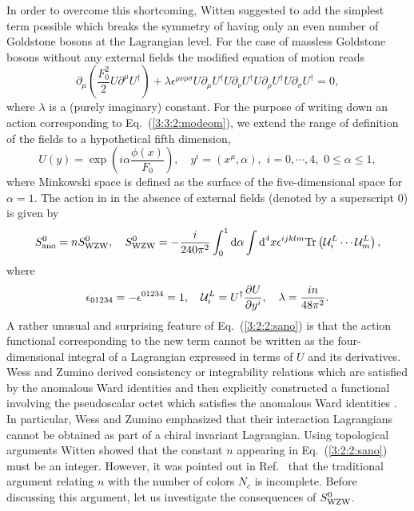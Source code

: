 \documentclass[twoside,12pt]{article}
\begin{document}
   In order to overcome this shortcoming, Witten suggested to add the simplest term
possible which breaks the symmetry of having only an even number of Goldstone
bosons at the Lagrangian level.
   For the case of massless Goldstone bosons without any
external fields the modified equation of motion reads
\begin{equation}
\label{3:3:2:modeom}
\partial_\mu\left(\frac{F_0^2}{2}U\partial^\mu U^\dagger\right)
+\lambda \epsilon^{\mu\nu\rho\sigma} U\partial_\mu U^\dagger
U\partial_\nu U^\dagger U\partial_\rho U^\dagger U\partial_\sigma
U^\dagger=0,
\end{equation}
where $\lambda$ is a (purely imaginary) constant.
   For the purpose of writing down an action corresponding to Eq.~(\ref{3:3:2:modeom}),
we extend the range of definition of the fields to a
hypothetical fifth dimension,
\begin{equation}
\label{3:2:ualpha}
U(y)=\exp\left(i\alpha\frac{\phi(x)}{F_0}\right),
\quad y^i=(x^\mu,\alpha),\,\,i=0,\cdots, 4,\,\, 0\leq\alpha\leq 1,
\end{equation}
   where Minkowski space is defined as the surface of the five-dimensional
space for $\alpha =1$.
   The action in in the absence of external fields (denoted by a superscript 0)
is given by \cite{Witten:1983tw}
\begin{equation}
\label{3:2:2:sano}
S_{\rm ano}^0=n S_{\rm WZW}^0,\quad
S_{\rm WZW}^0=-\frac{i}{240\pi^2}\int_0^1 \mbox{d} \alpha \int \mbox{d}^4 x
\epsilon^{ijklm} \mbox{Tr}\left( {\cal U}^L_i\cdots {\cal U}^L_m
\right),
\end{equation}
where
\begin{displaymath}
\epsilon_{01234}=-\epsilon^{01234}=1,\quad {\cal U}^L_i=U^\dagger
\frac{\partial U}{\partial y^i},\quad \lambda=\frac{in}{48\pi^2}.
\end{displaymath}
   A rather unusual and surprising feature of Eq.~(\ref{3:2:2:sano})
is that the action functional corresponding to the new term cannot be
written as the four-dimensional integral of a Lagrangian expressed
in terms of $U$ and its derivatives.
   Wess and Zumino derived consistency or integrability
relations which are satisfied by the anomalous Ward identities
and then explicitly constructed a functional involving the pseudoscalar octet
which satisfies the anomalous Ward identities \cite{Wess:1971yu}.
   In particular, Wess and Zumino emphasized that their interaction
Lagrangians cannot be obtained as part of a chiral invariant Lagrangian.
   Using topological arguments Witten showed that the constant $n$
appearing in Eq.\ (\ref{3:2:2:sano}) must be an integer.
   However, it was pointed out in Ref.~\cite{Bar:2001qk} that the traditional
argument relating $n$ with the number of colors $N_c$ is
incomplete. Before discussing this argument, let us investigate the consequences
of $S^0_{\rm WZW}$.
\end{document}
